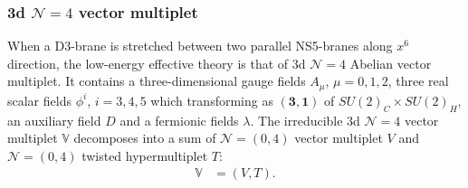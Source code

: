 \documentclass{article}
\numberwithin{equation}{section}
\begin{document}
\subsubsection{3d $\mathcal{N}=4$ vector multiplet}
\label{subsec_04BC1}
When a D3-brane is stretched between two parallel NS5-branes along $x^{6}$ direction, 
the low-energy effective theory is that of 3d $\mathcal{N}=4$ Abelian vector multiplet. 
It contains a three-dimensional gauge fields $A_{\mu}$, $\mu=0,1,2$, 
three real scalar fields $\phi^{i}$, $i=3,4,5$ which transforming as $(\bm{3},\bm{1})$ of $SU(2)_{C}\times SU(2)_{H}$, 
an auxiliary field $D$ and a fermionic fields $\lambda$. 
The irreducible 3d $\mathcal{N}=4$ vector multiplet $\mathbb{V}$ 
decomposes into a sum of $\mathcal{N}=(0,4)$ vector multiplet $V$ 
and $\mathcal{N}=(0,4)$ twisted hypermultiplet $T$:
\begin{align}
\label{3d4_v_half}
\mathbb{V}&=(V, T). 
\end{align}
\end{document}
